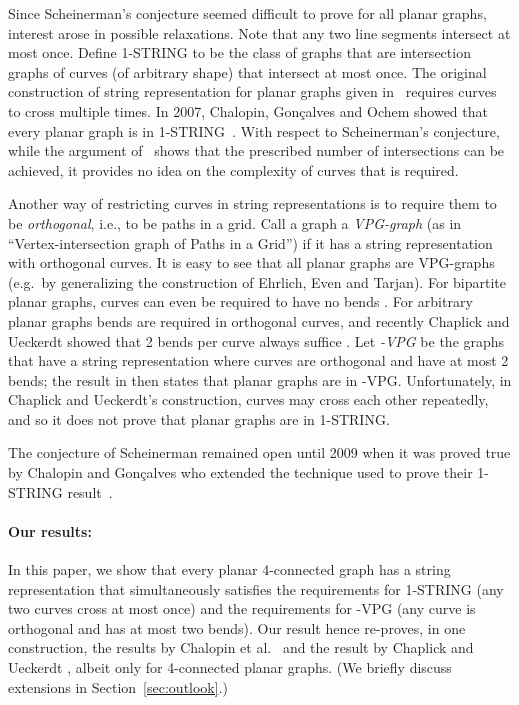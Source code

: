 \documentclass{article}
\begin{document}
Since Scheinerman's conjecture seemed difficult to prove for all planar
graphs, interest arose in possible relaxations.
Note that any two line segments intersect at most once.
Define 1-STRING to be the class of graphs that are intersection graphs
of curves (of arbitrary shape) that intersect at most once.
The original construction of string representation for planar graphs 
given in~\cite{cit:tarjan} requires curves to cross multiple times. 
In 2007, Chalopin, Gon\c{c}alves and Ochem showed that every
planar graph is in 1-STRING~\cite{cit:chalopin-gonclaves-ochem, cit:chalopin-string}.  With respect to Scheinerman's
conjecture, while the argument of~\cite{cit:chalopin-gonclaves-ochem, cit:chalopin-string} shows that the prescribed number
of intersections can be achieved, it provides no idea on the complexity of curves that is required.   

Another way of restricting curves in string representations is to require them
to be \emph{orthogonal}, i.e., to be paths in a grid.  Call a graph a
{\em VPG-graph} (as in ``Vertex-intersection graph of Paths in a Grid'')
if it has a string representation with orthogonal curves.
It is easy to see that all planar graphs are VPG-graphs (e.g.~by generalizing
the construction of Ehrlich, Even and Tarjan).  For bipartite planar graphs,
curves can even be required to have no bends \cite{cit:arroyo, cit:pach}.
For arbitrary planar graphs bends are required in orthogonal curves, and
recently Chaplick and Ueckerdt showed that 2 bends per curve always suffice
\cite{cit:chaplick}.  Let {\em -VPG} be the graphs that have
a string representation where curves are
orthogonal and have at most 2 bends; the result in
\cite{cit:chaplick} then states that planar graphs are in -VPG.
Unfortunately, in Chaplick and Ueckerdt's construction, curves may cross 
each other repeatedly, and so it
does not prove that planar graphs are in 1-STRING.

The conjecture of Scheinerman remained open until 2009 when it was proved true by Chalopin and Gon\c{c}alves \cite{cit:chalopin-gonclaves-ochem}
who extended the technique used to prove their 1-STRING 
result~\cite{cit:chalopin-seg}. 

\paragraph*{Our results:} 
In this paper, we show that every planar 4-connected graph has a 
string representation that simultaneously satisfies the requirements for
1-STRING (any two curves cross at most once) and the requirements
for -VPG (any curve is orthogonal and has at most two bends).
Our result hence re-proves, in one construction, the results
by Chalopin et al.~\cite{cit:chalopin-seg} and the result by
Chaplick and Ueckerdt \cite{cit:chaplick}, albeit only for 4-connected 
planar graphs. (We briefly discuss extensions in Section~\ref{sec:outlook}.)
\end{document}
